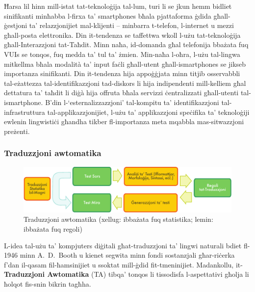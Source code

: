 \begin{multicols}{2}
Ħarsa lil hinn mill-istat tat-teknoloġija tal-lum, turi li se jkun hemm bidliet sinifikanti minħabba l-firxa ta’ smartphones bħala pjattaforma ġdida għall-ġestjoni ta’ relazzjonijiet mal-klijenti – minbarra t-telefon, l-internet u mezzi għall-posta elettronika. Din it-tendenza se taffettwa wkoll l-użu tat-teknoloġija għall-Interazzjoni tat-Taħdit. Minn naħa, id-domanda għal telefonija bbażata fuq VUIs se tonqos, fuq medda ta' tul ta’ żmien. Min-naħa l-oħra, l-użu tal-lingwa mitkellma bħala modalità ta’ input faċli għall-utent għall-ismartphones se jikseb importanza sinifikanti. 
Din it-tendenza hija appoġġjata minn titjib osservabbli tal-eżattezza tal-identifikazzjoni tad-diskors li hija indipendenti mill-kelliem għal dettatura ta’ taħdit li diġà hija offruta bħala servizzi ċentralizzati għall-utenti tal-ismartphone. B’din l-‘esternalizzazzjoni’ tal-kompitu ta’ identifikazzjoni tal-infrastruttura tal-applikazzjonijiet, l-użu ta’ applikazzjoni speċifika ta’ teknoloġiji ewlenin lingwistiċi għandha tikber fl-importanza meta mqabbla mas-sitwazzjoni preżenti.


\subsubsection{Traduzzjoni awtomatika}

\begin{figure}[htb]
  \centering
  
  \bigskip
  \includegraphics[width=\textwidth]{../_media/maltese/machine_translation}
  \caption{Traduzzjoni awtomatika (xellug: ibbażata fuq statistika; lemin: ibbażata fuq regoli)}
  \label{fig:mtarch_mt}
\end{figure}

L-idea tal-użu ta’ kompjuters diġitali għat-traduzzjoni ta’ lingwi naturali bdiet fl-1946 minn A.~D.~Booth u kienet segwita minn fondi sostanzjali għar-riċerka f'dan il-qasam fil-ħamsinijiet u ssoktat mill-ġdid fit-tmeninijiet. Madankollu, it-\textbf{Traduzzjoni Awtomatika} (TA) tibqa’ tonqos li tissodisfa l-aspettativi għolja li ħolqot fis-snin bikrin tagħha.


\end{multicols}
